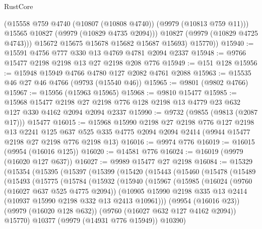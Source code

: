\begin{lexlean}{RustCore}
\begin{coremodule}
              (@15558 @759 @4740 (@10807 (@10808 @4740)) (@9979 (@10813 @759 @11)))
              @15565
              @10827
              (@9979 (@10829 @4735 @2094)))
            @10827
            (@9979 (@10829 @4725 @4743)))
          @15672
          @15675
          @15678
          @15682
          @15687
          @15693)
        @15770))
@15940 := @15591 @4756 @777 @330 @13 @4769 @4781 @2094 @2337
@15948 := @9766 @15477 @2198 @2198 @13 @27 @2198 @208 @776
@15949 := @151 @128
@15956 := @15948 @15949 @4766 @4780 @127 @2082 @4761 @2088
@15963 := @15535 @46 @27 @46 @4766 (@9793 (@15540 @46))
@15965 := @9801 (@9802 @4766)
@15967 := @15956 (@15963 @15965)
@15968 := @9810 @15477
@15985 := @15968
    @15477
    @2198
    @27
    @2198
    @776
    @128
    @2198
    @13
    @4779
    @23
    @632
    @127
    @330
    @4162
    @2094
    @2094
    @2337
@15990 := @9732 (@9855 (@9813 (@2087 @17))) @15477
@16015 := @15968
    @15990
    @2198
    @27
    @2198
    @776
    @127
    @2198
    @13
    @2241
    @125
    @637
    @525
    @335
    @4775
    @2094
    @2094
    @2414
    (@9944 @15477 @2198 @27 @2198 @776 @2198 @13)
@16016 := @9974 @776
@16019 := @16015 (@9954 (@16016 @125))
@16020 := @14581 @776
@16024 := @16019 (@9979 (@16020 @127 @637))
@16027 := @9989 @15477 @27 @2198
@16084 := @15329
    (@15354
      (@15395
        (@15397
          (@15399
            (@15420
              (@15443
                (@15460
                  (@15478
                    (@15489
                      (@15493
                        (@15775
                          (@15784
                            (@15932
                              (@15940
                                (@15967
                                  (@15985
                                    (@16024
                                      (@9760 (@16027 @637 @525 @4775 @2094))
                                      (@10905
                                        @15990
                                        @2198
                                        @335
                                        @13
                                        @2414
                                        (@10937 @15990 @2198 @332 @13 @2413 @10961)))
                                    (@9954 (@16016 @23))
                                    (@9979 (@16020 @128 @632))
                                    (@9760 (@16027 @632 @127 @4162 @2094))
                                    @15770)
                                  @10377
                                  (@9979 (@14931 @776 @15949))
                                  @10390)

\end{coremodule}
\end{lexlean}
